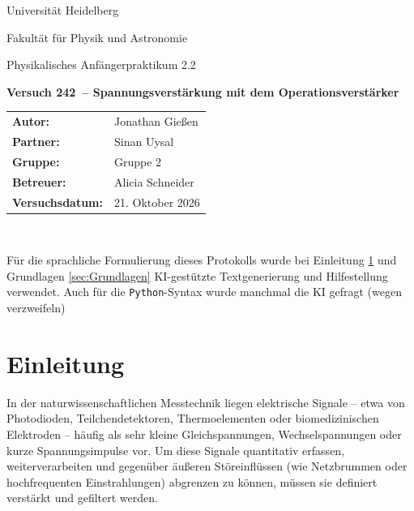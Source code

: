 \documentclass[12pt,a4paper,titlepage]{scrartcl}
\numberwithin{equation}{section}
\numberwithin{table}{section}
\numberwithin{figure}{section}
\newcommand{\versuch}{Versuch 242}
\newcommand{\titel}{Spannungsverstärkung mit dem Operationsverstärker}
\newcommand{\praktikum}{Physikalisches Anfängerpraktikum 2.2}
\newcommand{\autor}{Jonathan Gießen}
\newcommand{\partner}{Sinan Uysal}
\newcommand{\gruppe}{Gruppe 2}
\newcommand{\datum}{21. Oktober 2026}
\newcommand{\betreuer}{Alicia Schneider}
\begin{document}
\pagestyle{scrheadings}

\begin{titlepage}
    \centering
    \vspace*{4cm}
    {\large Universität Heidelberg\par}
    {\small Fakultät für Physik und Astronomie\par}
    {\Large \praktikum\par}
    \vspace{0.8cm}
    {\LARGE \bfseries \versuch\ -- \titel\par}
    \vspace{1.5cm}

    \begin{tabular}{ll}
        \textbf{Autor:} & \autor\\
        \textbf{Partner:} & \partner\\
        \textbf{Gruppe:} & \gruppe\\
        \textbf{Betreuer:} & \betreuer\\
        \textbf{Versuchsdatum:} & \datum\\
    \end{tabular}

    \vfill
    \hrulefill\
\end{titlepage}

\tableofcontents

\bigskip
\begin{tcolorbox}[colback=gray!5,colframe=gray!60,boxrule=0.8pt,arc=0.01mm,title=KI-Hinweis]
    Für die sprachliche Formulierung dieses Protokolls wurde bei Einleitung \ref{sec:Einleitung} und Grundlagen \ref{sec:Grundlagen}
    KI-gestützte Textgenerierung und Hilfestellung verwendet. Auch für die \texttt{Python}-Syntax wurde manchmal die KI gefragt (wegen verzweifeln)
\end{tcolorbox}

\clearpage

\section{Einleitung}\label{sec:Einleitung}

In der naturwissenschaftlichen Messtechnik liegen elektrische Signale -- etwa von Photodioden, Teilchendetektoren, Thermoelementen oder biomedizinischen Elektroden -- häufig als sehr kleine Gleichspannungen, Wechselspannungen oder kurze Spannungsimpulse vor. Um diese Signale quantitativ erfassen, weiterverarbeiten und gegenüber äußeren Störeinflüssen (wie Netzbrummen oder hochfrequenten Einstrahlungen) abgrenzen zu können, müssen sie definiert verstärkt und gefiltert werden.
\end{document}
